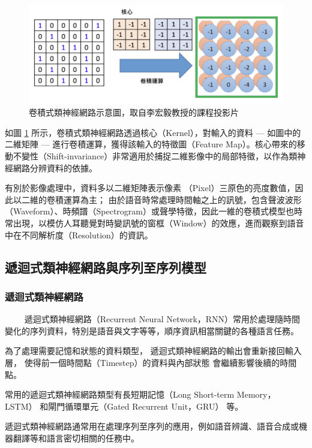 \begin{figure}
    \centering
    \includegraphics[width=0.9\linewidth]{figures/cnnnew.png}
    \caption{卷積式類神經網路示意圖，取自李宏毅教授的課程投影片}
    \label{fig:cnn}
\end{figure}

如圖 \ref{fig:cnn} 所示，卷積式類神經網路透過核心（Kernel），對輸入的資料 --- 如圖中的二維矩陣 --- 進行卷積運算，獲得該輸入的特徵圖（Feature Map）。核心帶來的移動不變性（Shift-invariance）非常適用於捕捉二維影像中的局部特徵，以作為類神經網路分辨資料的依據。

有別於影像處理中，資料多以二維矩陣表示像素 （Pixel）三原色的亮度數值，因此以二維的卷積運算為主；
由於語音時常處理時間軸之上的訊號，包含聲波波形（Waveform）、時頻譜（Spectrogram）或聲學特徵，因此一維的卷積式模型也時常出現，以模仿人耳聽覺對時變訊號的窗框（Window）的效應，進而觀察到語音中在不同解析度（Resolution）的資訊。


\subsection{遞迴式類神經網路與序列至序列模型}

\subsubsection{遞迴式類神經網路}
　　
遞迴式類神經網路（Recurrent Neural Network，RNN）常用於處理隨時間變化的序列資料，特別是語音與文字等等，順序資訊相當關鍵的各種語言任務。

為了處理需要記憶和狀態的資料類型，
遞迴式類神經網路的輸出會重新接回輸入層，
使得前一個時間點（Timestep）的資料與內部狀態
會繼續影響後續的時間點。

常用的遞迴式類神經網路類型有長短期記憶（Long Short-term Memory，LSTM）\cite{hochreiter1997long} 和閘門循環單元（Gated Recurrent Unit，GRU）\cite{cho-etal-2014-properties} 等。

遞迴式類神經網路通常用在處理序列至序列的應用，例如語音辨識、語音合成或機器翻譯等和語言密切相關的任務中。

